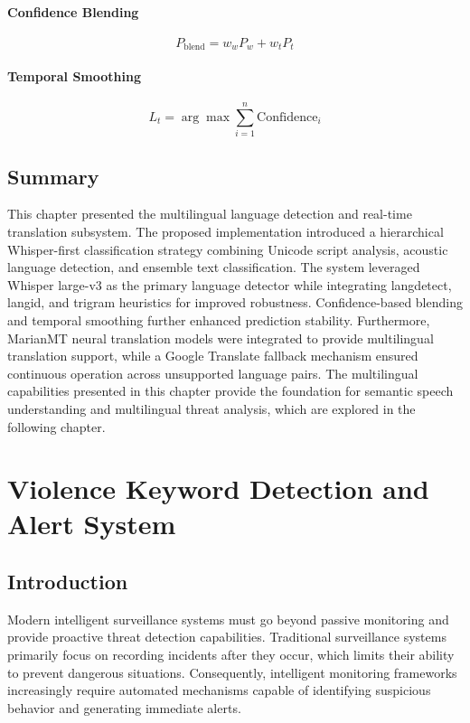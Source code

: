 \documentclass[12pt]{report}
\begin{document}
\subsubsection{Confidence Blending}
\[
P_{\text{blend}} = w_w P_w + w_t P_t
\]

\subsubsection{Temporal Smoothing}
\[
L_t = \arg\max \sum_{i=1}^{n} \text{Confidence}_i
\]

\section{Summary}

This chapter presented the multilingual language detection and real-time translation subsystem. The proposed implementation introduced a hierarchical Whisper-first classification strategy combining Unicode script analysis, acoustic language detection, and ensemble text classification. The system leveraged Whisper large-v3 as the primary language detector while integrating langdetect, langid, and trigram heuristics for improved robustness. Confidence-based blending and temporal smoothing further enhanced prediction stability. Furthermore, MarianMT neural translation models were integrated to provide multilingual translation support, while a Google Translate fallback mechanism ensured continuous operation across unsupported language pairs. The multilingual capabilities presented in this chapter provide the foundation for semantic speech understanding and multilingual threat analysis, which are explored in the following chapter.

\newpage

\chapter{Violence Keyword Detection and Alert System}
\label{ch:violence-keyword}
\setcounter{section}{0}

\section{Introduction}

Modern intelligent surveillance systems must go beyond passive monitoring and provide proactive threat detection capabilities. Traditional surveillance systems primarily focus on recording incidents after they occur, which limits their ability to prevent dangerous situations. Consequently, intelligent monitoring frameworks increasingly require automated mechanisms capable of identifying suspicious behavior and generating immediate alerts.
\end{document}
